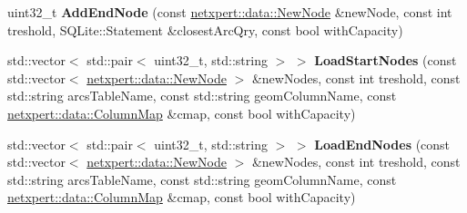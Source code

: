 \begin{DoxyCompactItemize}
\item 
uint32\+\_\+t {\bfseries Add\+End\+Node} (const \hyperlink{structnetxpert_1_1data_1_1NewNode}{netxpert\+::data\+::\+New\+Node} \&new\+Node, const int treshold, S\+Q\+Lite\+::\+Statement \&closest\+Arc\+Qry, const bool with\+Capacity)\hypertarget{classnetxpert_1_1Network_a952e607342737747e0cf5bb9e00bca52}{}\label{classnetxpert_1_1Network_a952e607342737747e0cf5bb9e00bca52}

\item 
std\+::vector$<$ std\+::pair$<$ uint32\+\_\+t, std\+::string $>$ $>$ {\bfseries Load\+Start\+Nodes} (const std\+::vector$<$ \hyperlink{structnetxpert_1_1data_1_1NewNode}{netxpert\+::data\+::\+New\+Node} $>$ \&new\+Nodes, const int treshold, const std\+::string arcs\+Table\+Name, const std\+::string geom\+Column\+Name, const \hyperlink{structnetxpert_1_1data_1_1ColumnMap}{netxpert\+::data\+::\+Column\+Map} \&cmap, const bool with\+Capacity)\hypertarget{classnetxpert_1_1Network_a1683ec40bf6d49e1a132f99d20ef53f8}{}\label{classnetxpert_1_1Network_a1683ec40bf6d49e1a132f99d20ef53f8}

\item 
std\+::vector$<$ std\+::pair$<$ uint32\+\_\+t, std\+::string $>$ $>$ {\bfseries Load\+End\+Nodes} (const std\+::vector$<$ \hyperlink{structnetxpert_1_1data_1_1NewNode}{netxpert\+::data\+::\+New\+Node} $>$ \&new\+Nodes, const int treshold, const std\+::string arcs\+Table\+Name, const std\+::string geom\+Column\+Name, const \hyperlink{structnetxpert_1_1data_1_1ColumnMap}{netxpert\+::data\+::\+Column\+Map} \&cmap, const bool with\+Capacity)\hypertarget{classnetxpert_1_1Network_a07ccb6117e654f707359383d8988e373}{}\label{classnetxpert_1_1Network_a07ccb6117e654f707359383d8988e373}


\end{DoxyCompactItemize}
